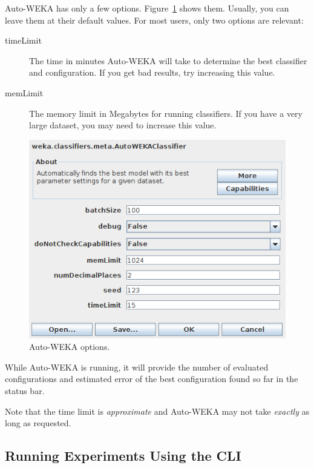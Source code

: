 \documentclass{article}
\begin{document}
Auto-WEKA has only a few options. Figure~\ref{fig:options} shows them. Usually,
you can leave them at their default values. For most users, only two options are
relevant:
\begin{description}
\item[timeLimit] The time in minutes Auto-WEKA will take to determine the best
classifier and configuration. If you get bad results, try increasing this value.
\item[memLimit] The memory limit in Megabytes for running classifiers. If you
have a very large dataset, you may need to increase this value.
\end{description}

\begin{figure}[!ht]
\begin{center}
\includegraphics[width=.8\textwidth]{options}
\caption{Auto-WEKA options.}
\label{fig:options}
\end{center}
\end{figure}

While Auto-WEKA is running, it will provide the number of evaluated
configurations and estimated error of the best configuration found so far in the
status bar.

\medskip

Note that the time limit is \emph{approximate} and Auto-WEKA may not take
\emph{exactly} as long as requested.

\subsection{Running Experiments Using the CLI}\label{sec:running}
\end{document}
